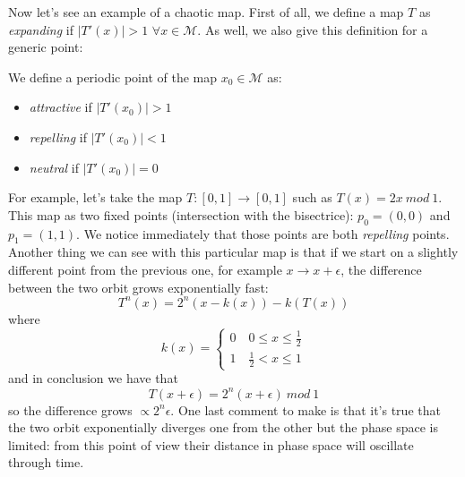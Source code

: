 Now let's see an example of a chaotic map.
First of all, we define a map $T$ as \emph{expanding} if $\left\lvert T'\left(x\right)\right\rvert > 1$ $\forall x \in \mathcal{M}$.
As well, we also give this definition for a generic point:
\begin{definition}
    We define a periodic point of the map $x_0 \in \mathcal{M}$ as:
    \begin{itemize}
        \item \emph{attractive} if $\left\lvert T'\left(x_0\right)\right\rvert > 1$
        \item \emph{repelling} if $\left\lvert T'\left(x_0\right)\right\rvert < 1$
        \item \emph{neutral} if $\left\lvert T'\left(x_0\right)\right\rvert = 0$
    \end{itemize}
\end{definition}
For example, let's take the map $T : \left[0,1\right] \to \left[0,1\right]$ such as $T\left(x\right)=2x \ mod \ 1$.
This map as two fixed points (intersection with the bisectrice): $p_0 = \left(0,0\right)$ and $p_1 = \left(1,1\right)$.
We notice immediately that those points are both \emph{repelling} points.
Another thing we can see with this particular map is that if we start on a slightly different point from the previous one, for example $x \to x + \epsilon$, the difference between the two orbit grows exponentially fast:
$$
    T^n\left(x\right)=2^n\left(x-k\left(x\right)\right)-k\left(T\left(x\right)\right)
$$
where
$$
    k\left(x\right)=
    \begin{cases}
        0 \quad 0\leq x \leq \frac{1}{2} \\
        1 \quad \frac{1}{2} < x \leq 1
    \end{cases}
$$
and in conclusion we have that
$$
    T\left(x + \epsilon\right)=2^n\left(x + \epsilon\right) \ mod \ 1
$$
so the difference grows $\propto 2^n\epsilon$.
One last comment to make is that it's true that the two orbit exponentially diverges one from the other but the phase space is limited: from this point of view their distance in phase space will oscillate through time.


